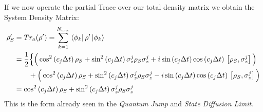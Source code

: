 \documentclass[a4paper,12pt]{article}
\begin{document}
	If we now operate the partial Trace over our total density matrix we obtain the System Density Matrix:
	\begin{align}
		\rho_S' & = Tr_a(\rho') = \sum_{k=1}^{N_{anc}}{\bra{\phi_k}\rho'\ket{\phi_k}} \notag \\
		&= \frac{1}{2} \Big\{ \Big( \cos^{2}{\left( c_j \Delta t \right)} \, \rho_S + \sin^{2}{\left( c_j \Delta t \right)} \, \sigma_{z}^{j}\rho_S\sigma_{z}^{j}
		+i \sin{\left( c_j \Delta t \right)}\cos{\left( c_j \Delta t \right)} \, \left[ \rho_S, \sigma_{z}^{j} \right] \Big) \notag \\
		& \qquad  + \Big( \cos^{2}{\left( c_j \Delta t \right)} \, \rho_S + \sin^{2}{\left( c_j \Delta t \right)} \, \sigma_{z}^{j}\rho_S\sigma_{z}^{j}
		-i \sin{\left( c_j \Delta t \right)}\cos{\left( c_j \Delta t \right)} \, \left[ \rho_S, \sigma_{z}^{j} \right] \Big) \notag \\
		& =	\cos^{2}{\left( c_j \Delta t \right)} \, \rho_S + \sin^{2}{\left( c_j \Delta t \right)} \, \sigma_{z}^{j}\rho_S\sigma_{z}^{j}
		\label{eq:rho_evo_cohe}
	\end{align}
	This is the form already seen in the \textit{Quantum Jump} and \textit{State Diffusion Limit}.
\end{document}
